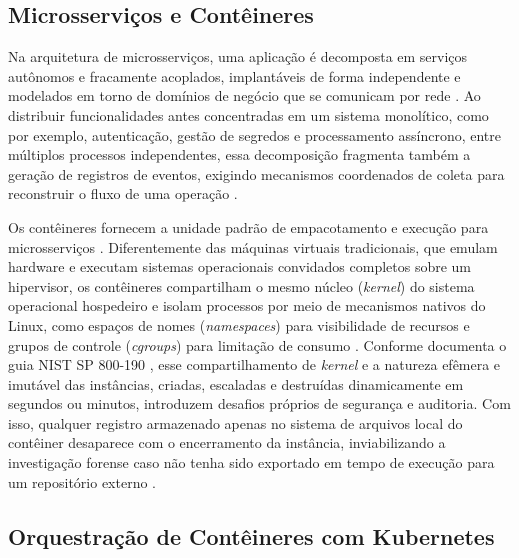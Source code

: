 \subsection{Microsserviços e Contêineres}
\label{subsec:ref_microsservicos_conteineres}

Na arquitetura de microsserviços, uma aplicação é decomposta em serviços autônomos e fracamente acoplados, implantáveis de forma independente e modelados em torno de domínios de negócio que se comunicam por rede \cite{newman2021}. Ao distribuir funcionalidades antes concentradas em um sistema monolítico, como por exemplo, autenticação, gestão de segredos e processamento assíncrono, entre múltiplos processos independentes, essa decomposição fragmenta também a geração de registros de eventos, exigindo mecanismos coordenados de coleta para reconstruir o fluxo de uma operação \cite{newman2021,albuquerque2024}.

Os contêineres fornecem a unidade padrão de empacotamento e execução para microsserviços \cite{cncf2024}. Diferentemente das máquinas virtuais tradicionais, que emulam hardware e executam sistemas operacionais convidados completos sobre um hipervisor, os contêineres compartilham o mesmo núcleo (\textit{kernel}) do sistema operacional hospedeiro e isolam processos por meio de mecanismos nativos do Linux, como espaços de nomes (\textit{namespaces}) para visibilidade de recursos e grupos de controle (\textit{cgroups}) para limitação de consumo \cite{nist800_190}. Conforme documenta o guia NIST SP 800-190 \cite{nist800_190}, esse compartilhamento de \textit{kernel} e a natureza efêmera e imutável das instâncias,  criadas, escaladas e destruídas dinamicamente em segundos ou minutos,  introduzem desafios próprios de segurança e auditoria.  Com isso, qualquer registro armazenado apenas no sistema de arquivos local do contêiner desaparece com o encerramento da instância, inviabilizando a investigação forense caso não tenha sido exportado em tempo de execução para um repositório externo \cite{nist800_190,jin2025,zhang2025}.

\subsection{Orquestração de Contêineres com Kubernetes}
\label{subsec:ref_kubernetes}

